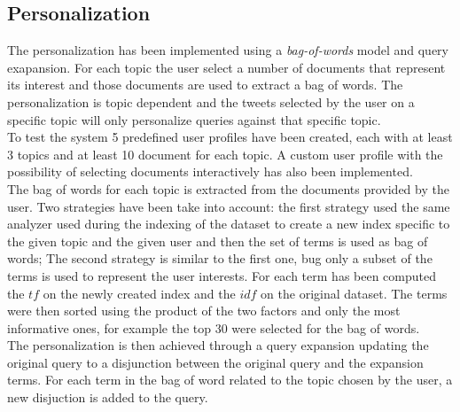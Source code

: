 

\subsection{Personalization}
The personalization has been implemented using a \textit{bag-of-words} model and query exapansion. For each topic the user select a number of documents that represent its interest and those documents are used to extract a bag of words.
The personalization is topic dependent and the tweets selected by the user on a specific topic will only personalize queries against that specific topic.\\
To test the system 5 predefined user profiles have been created, each with at least 3 topics and at least 10 document for each topic. A custom user profile with the possibility of selecting documents interactively has also been implemented.\\
The bag of words for each topic is extracted from the documents provided by the user. Two strategies have been take into account: the first strategy used the same analyzer used during the indexing of the dataset to create a new index specific to the given topic and the given user and then the set of terms is used as bag of words; The second strategy is similar to the first one, bug only a subset of the terms is used to represent the user interests. For each term has been computed the $tf$ on the newly created index and the $idf$ on the original dataset. The terms were then sorted using the product of the two factors and only the most informative ones, for example the top 30 were selected for the bag of words.\\
The personalization is then achieved through a query expansion updating the original query to a disjunction between the original query and the expansion terms. For each term in the bag of word related to the topic chosen by the user, a new disjuction is added to the query.

